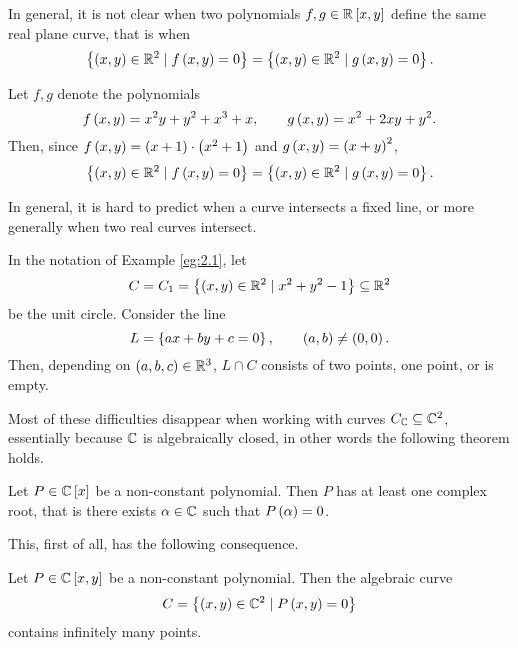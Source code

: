 \begin{fact*}
In general, it is not clear when two polynomials $ f, g \in \mathbb{R}\left[ x, y \right] $ define the same real plane curve, that is when
$$ \left\{ \left( x, y \right) \in \mathbb{R}^2 \mid f\left( x, y \right) = 0 \right\} = \left\{ \left( x, y \right) \in \mathbb{R}^2 \mid g\left( x, y \right) = 0 \right\}. $$
\end{fact*}

\begin{example}
\label{eg:2.2}
Let $ f, g $ denote the polynomials
$$ f\left( x, y \right) = x^2y + y^2 + x^3 + x, \qquad g\left( x, y \right) = x^2 + 2xy + y^2. $$
Then, since $ f\left( x, y \right) = \left( x + 1 \right) \cdot \left( x^2 + 1 \right) $ and $ g\left( x, y \right) = \left( x + y \right)^2 $,
$$ \left\{ \left( x, y \right) \in \mathbb{R}^2 \mid f\left( x, y \right) = 0 \right\} = \left\{ \left( x, y \right) \in \mathbb{R}^2 \mid g\left( x, y \right) = 0 \right\}. $$
\end{example}

\begin{fact*}
In general, it is hard to predict when a curve intersects a fixed line, or more generally when two real curves intersect.
\end{fact*}

\begin{example}
In the notation of Example \ref{eg:2.1}, let
$$ C = C_1 = \left\{ \left( x, y \right) \in \mathbb{R}^2 \mid x^2 + y^2 - 1 \right\} \subseteq \mathbb{R}^2 $$
be the unit circle. Consider the line
$$ L = \left\{ ax + by + c = 0 \right\}, \qquad \left( a, b \right) \ne \left( 0, 0 \right). $$
Then, depending on $ \left( a, b, c \right) \in \mathbb{R}^3 $, $ L \cap C $ consists of two points, one point, or is empty.
\end{example}

Most of these difficulties disappear when working with curves $ C_{\mathbb{C}} \subseteq \mathbb{C}^2 $, essentially because $ \mathbb{C} $ is algebraically closed, in other words the following theorem holds.

\begin{theorem}
\label{thm:2.4}
Let $ P \in \mathbb{C}\left[ x \right] $ be a non-constant polynomial. Then $ P $ has at least one complex root, that is there exists $ \alpha \in \mathbb{C} $ such that $ P\left( \alpha \right) = 0 $.
\end{theorem}

\pagebreak

This, first of all, has the following consequence.

\begin{proposition}
Let $ P \in \mathbb{C}\left[ x, y \right] $ be a non-constant polynomial. Then the algebraic curve
$$ C = \left\{ \left( x, y \right) \in \mathbb{C}^2 \mid P\left( x, y \right) = 0 \right\} $$
contains infinitely many points.
\end{proposition}

